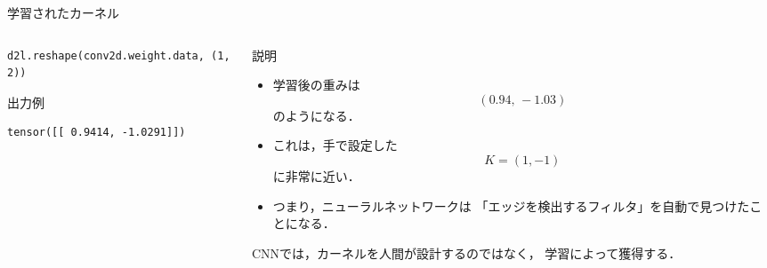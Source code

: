 \documentclass[dvipdfmx,uplatex,unicode,9pt,aspectratio=169]{beamer}
\begin{document}
\begin{frame}[fragile]{学習されたカーネル}
\begin{columns}[T,onlytextwidth]
\begin{column}{0.50\textwidth}
\begin{lstlisting}
d2l.reshape(conv2d.weight.data, (1, 2))
\end{lstlisting}

\begin{block}{出力例}
\begin{lstlisting}
tensor([[ 0.9414, -1.0291]])
\end{lstlisting}
\end{block}
\end{column}

\begin{column}{0.47\textwidth}
\begin{block}{説明}
\begin{itemize}
\item 学習後の重みは
\[
(0.94,\,-1.03)
\]
のようになる．
\item これは，手で設定した
\[
K=(1,-1)
\]
に非常に近い．
\item つまり，ニューラルネットワークは
「エッジを検出するフィルタ」を自動で見つけたことになる．
\end{itemize}
\end{block}

\begin{seminaralertbox}
CNNでは，カーネルを人間が設計するのではなく，
学習によって獲得する．
\end{seminaralertbox}
\end{column}
\end{columns}
\end{frame}
\end{document}
